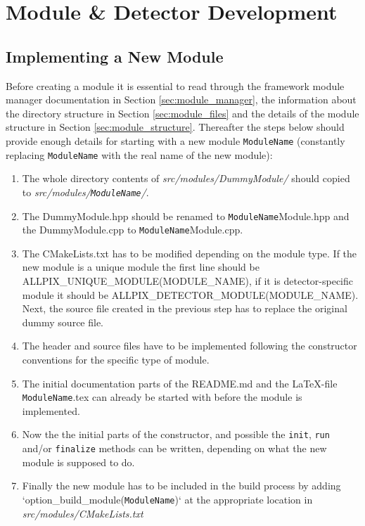\section{Module \& Detector Development}
\subsection{Implementing a New Module}
\label{sec:building_new_module}
Before creating a module it is essential to read through the framework module manager documentation in Section \ref{sec:module_manager}, the information about the directory structure in Section \ref{sec:module_files} and the details of the module structure in Section \ref{sec:module_structure}. Thereafter the steps below should provide enough details for starting with a new module \texttt{ModuleName} (constantly replacing  \texttt{ModuleName} with the real name of the new module):
\begin{enumerate}
\item The whole directory contents of \textit{src/modules/DummyModule/} should copied to \textit{src/modules/\texttt{ModuleName}/}.
\item The DummyModule.hpp should be renamed to \texttt{ModuleName}Module.hpp and the DummyModule.cpp to \texttt{ModuleName}Module.cpp.
\item The CMakeLists.txt has to be modified depending on the module type. If the new module is a unique module the first line should be ALLPIX\_UNIQUE\_MODULE(MODULE\_NAME), if it is
 detector-specific module it should be ALLPIX\_DETECTOR\_MODULE(MODULE\_NAME). Next, the source file created in the previous step has to replace the original dummy source file.
\item The header and source files have to be implemented following the constructor conventions for the specific type of module.
\item The initial documentation parts of the README.md and the \LaTeX-file \texttt{ModuleName}.tex can already be started with before the module is implemented.
\item Now the the initial parts of the constructor, and possible the \texttt{init}, \texttt{run} and/or \texttt{finalize} methods can be written, depending on what the new module is supposed to do.
\item Finally the new module has to be included in the build process by adding `option\_build\_module(\texttt{ModuleName})` at the appropriate location in \textit{src/modules/CMakeLists.txt}
\end{enumerate}

